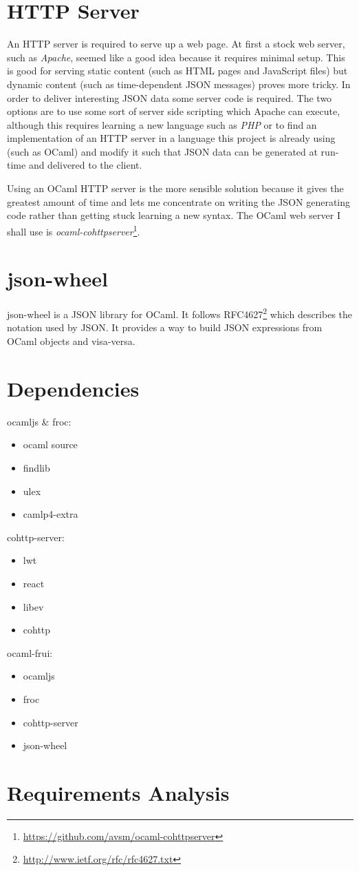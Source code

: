 \section{HTTP Server}
An HTTP server is required to serve up a web page. At first a stock web server, such as \emph{Apache}, seemed like a good idea because it requires minimal setup. This is good for serving static content (such as HTML pages and JavaScript files) but dynamic content (such as time-dependent JSON messages) proves more tricky. In order to deliver interesting JSON data some server code is required. The two options are to use some sort of server side scripting which Apache can execute, although this requires learning a new language such as \emph{PHP} or to find an implementation of an HTTP server in a language this project is already using (such as OCaml) and modify it such that JSON data can be generated at run-time and delivered to the client.

Using an OCaml HTTP server is the more sensible solution because it gives the greatest amount of time and lets me concentrate on writing the JSON generating code rather than getting stuck learning a new syntax. The OCaml web server I shall use is \emph{ocaml-cohttpserver}\footnote{\url{https://github.com/avsm/ocaml-cohttpserver}}.

\section{json-wheel}
json-wheel is a JSON library for OCaml. It follows RFC4627\footnote{\url{http://www.ietf.org/rfc/rfc4627.txt}} which describes the notation used by JSON. It provides a way to build JSON expressions from OCaml objects and visa-versa.

\section{Dependencies}
ocamljs \& froc:
\begin{itemize}
\item ocaml source
\item findlib
\item ulex
\item camlp4-extra
\end{itemize}
cohttp-server:
\begin{itemize}
\item lwt
\item react
\item libev
\item cohttp
\end{itemize}
ocaml-frui:
\begin{itemize}
\item ocamljs
\item froc
\item cohttp-server
\item json-wheel
\end{itemize}

\section{Requirements Analysis}
